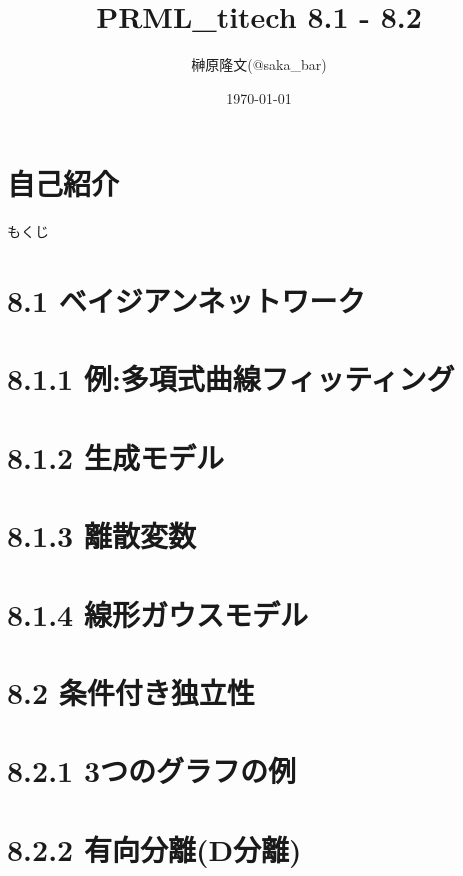 \documentclass[dvipdfm, t]{beamer}
\title{PRML\_titech 8.1 - 8.2}
\author{榊原隆文(@saka\_bar)}
\date{\today}
\begin{document}
\maketitle

 \section*{自己紹介}
 

 \begin{frame}{もくじ}
  \tableofcontents
 \end{frame}

 \section{8.1 ベイジアンネットワーク}
 

 \section{8.1.1 例:多項式曲線フィッティング}
 

 \section{8.1.2 生成モデル}
 

 \section{8.1.3 離散変数}
 

 \section{8.1.4 線形ガウスモデル}
 

 \section{8.2 条件付き独立性}
 

 \section{8.2.1 3つのグラフの例}
 

 \section{8.2.2 有向分離(D分離)}
 
\end{document}
